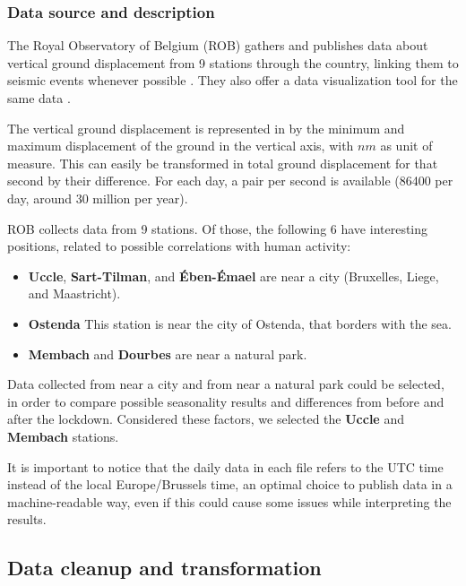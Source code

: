 \documentclass[12pt]{article}
\begin{document}
\subsubsection{Data source and description}
The Royal Observatory of Belgium (ROB) gathers and publishes \cite{RoyalDataPolicy,Data20200402} data about vertical ground displacement from 9 stations through the country, linking them to seismic events whenever possible \cite{DataEvents20200402}. They also offer a data visualization tool for the same data \cite{DataVisualization20200402}.

The vertical ground displacement is represented in by the minimum and maximum displacement of the ground in the vertical axis, with $nm$ as unit of measure. This can easily be transformed in total ground displacement for that second by their difference.
For each day, a pair per second is available (86400 per day, around 30 million per year).

ROB collects data from 9 stations. Of those, the following 6 have interesting positions, related to possible correlations with human activity:
\begin{itemize}[topsep=0.5em,itemsep=0em,partopsep=0.5em]
	\item \textbf{Uccle}, \textbf{Sart-Tilman}, and \textbf{Ében-Émael} are near a city (Bruxelles, Liege, and Maastricht).
	\item \textbf{Ostenda} This station is near the city of Ostenda, that borders with the sea.
	\item \textbf{Membach} and \textbf{Dourbes} are near a natural park.
\end{itemize}

Data collected from near a city and from near a natural park could be selected, in order to compare possible seasonality results and differences from before and after the lockdown. %
Considered these factors, we selected the \textbf{Uccle} and \textbf{Membach} stations.

It is important to notice that the daily data in each file refers to the UTC time instead of the local Europe/Brussels time, an optimal choice to publish data in a machine-readable way, even if this could cause some issues while interpreting the results.

\subsection{Data cleanup and transformation}\label{sec:cleanup-transform}
\end{document}
